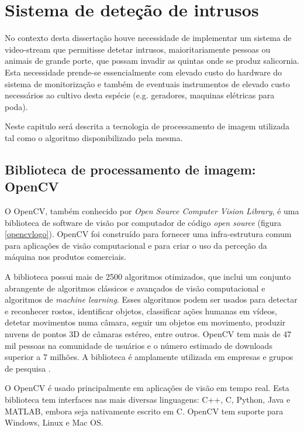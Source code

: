 

\chapter{Sistema de deteção de intrusos}


No contexto desta dissertação houve necessidade de implementar um sistema de video-stream que permitisse detetar intrusos, maioritariamente pessoas ou animais de grande porte, que possam invadir as quintas onde se produz salicornia. Esta necessidade prende-se essencialmente com elevado custo do hardware do sistema de monitorização e também de eventuais instrumentos de elevado custo necessários ao cultivo desta espécie (e.g. geradores, maquinas elétricas para poda).

Neste capitulo será descrita a tecnologia de processamento de imagem utilizada tal como o algoritmo disponibilizado pela mesma. 


\section{Biblioteca de processamento de imagem: OpenCV}

O OpenCV, também conhecido por \textit{Open Source Computer Vision Library}, é uma biblioteca de software de visão por computador de código \textit{open source} (figura \ref{opencvlogo}). OpenCV foi construído para fornecer uma infra-estrutura comum para aplicações de visão computacional e para criar o uso da perceção da máquina nos produtos comerciais.

A biblioteca possui mais de 2500 algoritmos otimizados, que inclui um conjunto abrangente de algoritmos clássicos e avançados de visão computacional e algoritmos de \textit{machine learning}. Esses algoritmos podem ser usados para detectar e reconhecer rostos, identificar objetos, classificar ações humanas em vídeos, detetar movimentos numa câmara, seguir um objetos em movimento, produzir nuvens de pontos 3D de câmaras estéreo, entre outros.
OpenCV tem mais de 47 mil pessoas na comunidade de usuários e o número estimado de downloads superior a 7 milhões. A biblioteca é amplamente utilizada em empresas e grupos de pesquisa \cite{Itseez}.

O OpenCV é usado principalmente em aplicações de visão em tempo real. Esta biblioteca tem interfaces nas mais diversas linguagens: C++, C, Python, Java e MATLAB, embora seja nativamente escrito em C. OpenCV tem suporte para Windows, Linux e Mac OS\cite{Itseez}. 

